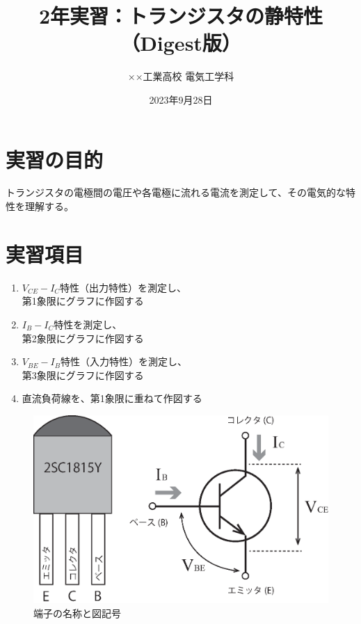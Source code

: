 \documentclass[uplatex,a4paper,11pt,oneside,openany]{jsarticle}
\begin{document}
	\title{2年実習：トランジスタの静特性（Digest版）}
	\author{××工業高校 電気工学科}
	\date{2023年9月28日}
	\maketitle
	\pagestyle{empty}
	
	\section{実習の目的}
	トランジスタの電極間の電圧や各電極に流れる電流を測定して、その電気的な特性を理解する。
	
	\section{実習項目}
	
	\begin{multicols}{2}
		\begin{enumerate}
			\item $V_{CE} - I_C$特性（出力特性）を測定し、\\第1象限にグラフに作図する
			\item $I_B - I_C$特性を測定し、\\第2象限にグラフに作図する
			\item $V_{BE} - I_B$特性（入力特性）を測定し、\\第3象限にグラフに作図する
			\item 直流負荷線を、第1象限に重ねて作図する
		\end{enumerate}
		
		\begin{figure}[H]
			\centering
			\includegraphics[keepaspectratio, scale=0.4, angle=0]
			{figs/eps/illust.eps}
			\caption{端子の名称と図記号}
			\label{fig:ex2}
		\end{figure}
	\end{multicols}
		
\end{document}
